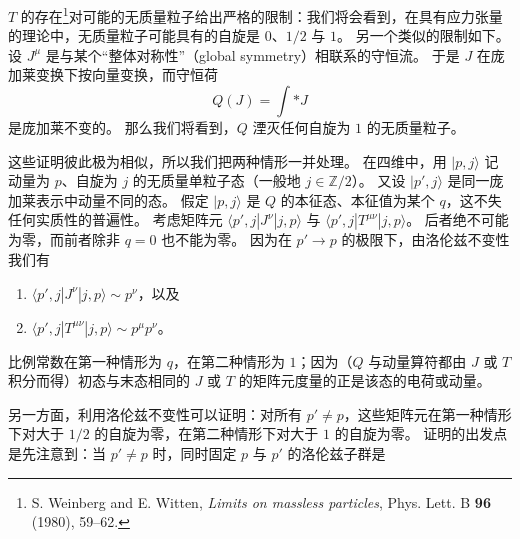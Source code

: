 $T$ 的存在\footnote{S. Weinberg and E. Witten, \textit{Limits on massless particles}, Phys. Lett. B \textbf{96} (1980), 59--62.}对可能的无质量粒子给出严格的限制：我们将会看到，在具有应力张量的理论中，无质量粒子可能具有的自旋是 $0$、$1/2$ 与 $1$。
另一个类似的限制如下。
设 $J^\mu$ 是与某个“整体对称性”（global symmetry）相联系的守恒流。
于是 $J$ 在庞加莱变换下按向量变换，而守恒荷
\[
  Q(J)=\int *J
\]
是庞加莱不变的。
那么我们将看到，$Q$ 湮灭任何自旋为 $1$ 的无质量粒子。

这些证明彼此极为相似，所以我们把两种情形一并处理。
在四维中，用 $|p,j\rangle$ 记动量为 $p$、自旋为 $j$ 的无质量单粒子态（一般地 $j\in\mathbb{Z}/2$）。
又设 $|p',j\rangle$ 是同一庞加莱表示中动量不同的态。
假定 $|p,j\rangle$ 是 $Q$ 的本征态、本征值为某个 $q$，这不失任何实质性的普遍性。
考虑矩阵元 $\langle p',j|J^\nu|j,p\rangle$ 与 $\langle p',j|T^{\mu\nu}|j,p\rangle$。
后者绝不可能为零，而前者除非 $q=0$ 也不能为零。
因为在 $p'\to p$ 的极限下，由洛伦兹不变性我们有
\begin{enumerate}
  \item $\langle p',j|J^\nu|j,p\rangle\sim p^\nu$，以及
  \item $\langle p',j|T^{\mu\nu}|j,p\rangle\sim p^\mu p^\nu$。
\end{enumerate}
比例常数在第一种情形为 $q$，在第二种情形为 $1$；因为（$Q$ 与动量算符都由 $J$ 或 $T$ 积分而得）初态与末态相同的 $J$ 或 $T$ 的矩阵元度量的正是该态的电荷或动量。


另一方面，利用洛伦兹不变性可以证明：对所有 $p'\neq p$，这些矩阵元在第一种情形下对大于 $1/2$ 的自旋为零，在第二种情形下对大于 $1$ 的自旋为零。
证明的出发点是先注意到：当 $p'\neq p$ 时，同时固定 $p$ 与 $p'$ 的洛伦兹子群是

